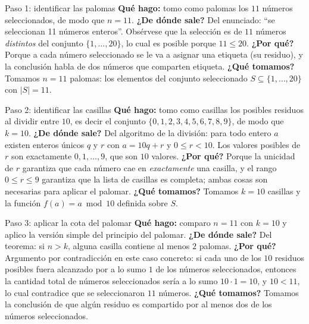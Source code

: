 \documentclass[11pt]{article}
\begin{document}
\begin{sol}

\begin{paso}{Paso 1: identificar las palomas}
\textbf{Qu\'e hago:} tomo como palomas los $11$ n\'umeros seleccionados, de modo que $n=11$.
\textbf{¿De d\'onde sale?} Del enunciado: ``se seleccionan 11 n\'umeros enteros''. Obs\'ervese que la selecci\'on es de $11$ n\'umeros \emph{distintos} del conjunto $\{1,\dots,20\}$, lo cual es posible porque $11\le 20$.
\textbf{¿Por qu\'e?} Porque a cada n\'umero seleccionado se le va a asignar una etiqueta (su residuo), y la conclusi\'on habla de dos n\'umeros que comparten etiqueta.
\textbf{¿Qu\'e tomamos?} Tomamos $n=11$ palomas: los elementos del conjunto seleccionado $S\subseteq\{1,\dots,20\}$ con $|S|=11$.
\end{paso}

\begin{paso}{Paso 2: identificar las casillas}
\textbf{Qu\'e hago:} tomo como casillas los posibles residuos al dividir entre $10$, es decir el conjunto $\{0,1,2,3,4,5,6,7,8,9\}$, de modo que $k=10$.
\textbf{¿De d\'onde sale?} Del algoritmo de la divisi\'on: para todo entero $a$ existen enteros \'unicos $q$ y $r$ con $a = 10q+r$ y $0\le r<10$. Los valores posibles de $r$ son exactamente $0,1,\dots,9$, que son $10$ valores.
\textbf{¿Por qu\'e?} Porque la unicidad de $r$ garantiza que cada n\'umero cae en \emph{exactamente} una casilla, y el rango $0\le r\le 9$ garantiza que la lista de casillas es completa; ambas cosas son necesarias para aplicar el palomar.
\textbf{¿Qu\'e tomamos?} Tomamos $k=10$ casillas y la funci\'on $f(a)=a \bmod 10$ definida sobre $S$.
\end{paso}

\begin{paso}{Paso 3: aplicar la cota del palomar}
\textbf{Qu\'e hago:} comparo $n=11$ con $k=10$ y aplico la versi\'on simple del principio del palomar.
\textbf{¿De d\'onde sale?} Del teorema: si $n>k$, alguna casilla contiene al menos $2$ palomas.
\textbf{¿Por qu\'e?} Argumento por contradicci\'on en este caso concreto: si cada uno de los $10$ residuos posibles fuera alcanzado por a lo sumo $1$ de los n\'umeros seleccionados, entonces la cantidad total de n\'umeros seleccionados ser\'ia a lo sumo $10\cdot 1 = 10$, y $10 < 11$, lo cual contradice que se seleccionaron $11$ n\'umeros.
\textbf{¿Qu\'e tomamos?} Tomamos la conclusi\'on de que alg\'un residuo es compartido por al menos dos de los n\'umeros seleccionados.
\end{paso}


\end{sol}
\end{document}
